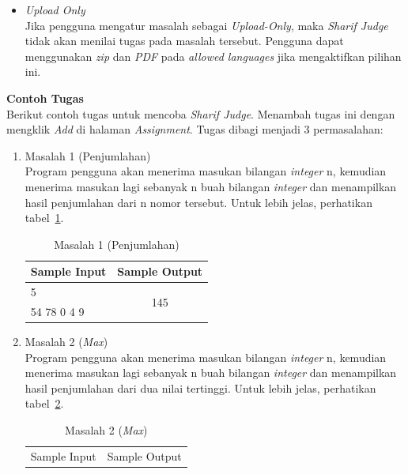 \documentclass[a4paper,twoside]{article}
\begin{document}
\begin{enumerate}
\begin{enumerate}
\begin{itemize}
				\item \textit{Upload Only} \\
				Jika pengguna mengatur masalah sebagai \textit{Upload-Only}, maka \textit{Sharif Judge} tidak akan menilai tugas pada masalah tersebut. Pengguna dapat menggunakan \textit{zip} dan \textit{PDF} pada \textit{allowed languages} jika mengaktifkan pilihan ini.
			\end{itemize}
			
			\textbf{Contoh Tugas} \\
			
			Berikut contoh tugas untuk mencoba \textit{Sharif Judge}. Menambah tugas ini dengan mengklik \textit{Add} di halaman \textit{Assignment}. Tugas dibagi menjadi 3 permasalahan:
			\begin{enumerate}
				\item Masalah 1 (Penjumlahan) \\
				Program pengguna akan menerima masukan bilangan \textit{integer} n, kemudian menerima masukan lagi sebanyak n buah bilangan \textit{integer} dan menampilkan hasil penjumlahan dari n nomor tersebut. Untuk lebih jelas, perhatikan tabel~\ref{tab:tablesum}.
				
				\begin{table}[H] %
					\centering 
					\caption{Masalah 1 (Penjumlahan)}
					\label{tab:tablesum}
					\begin{tabular}{cc}
						\toprule
						Sample Input & Sample Output\\
						
						\midrule
						\multicolumn{1}{l}{5} & \multirow{2}{*}{145}\\
						\multicolumn{1}{l}{54 78 0 4 9} & \\
						
						\bottomrule
						
					\end{tabular} 
				\end{table}
				
				\item Masalah 2 (\textit{Max}) \\
				Program pengguna akan menerima masukan bilangan \textit{integer} n, kemudian menerima masukan lagi sebanyak n buah bilangan \textit{integer} dan menampilkan hasil penjumlahan dari dua nilai tertinggi. Untuk lebih jelas, perhatikan tabel~\ref{tab:tablemax}.
				
				\begin{table}[H] %
					\centering 
					\caption{Masalah 2 (\textit{Max})}
					\label{tab:tablemax}
					\begin{tabular}{cc}
						\toprule
						Sample Input & Sample Output\\
						

\end{tabular}
\end{table}
\end{enumerate}
\end{enumerate}
\end{enumerate}
\end{document}
